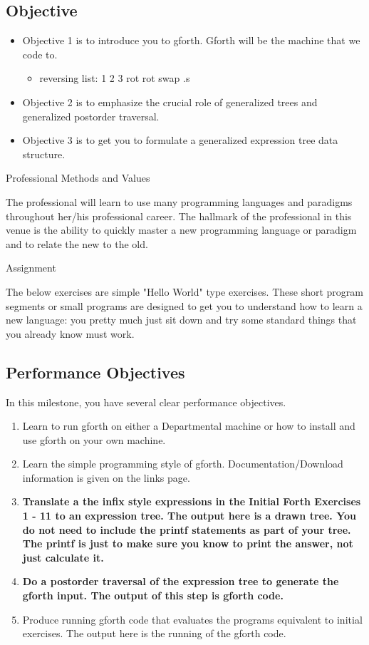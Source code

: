 \documentclass[letterpaper,10pt]{article}
\begin{document}
\subsection{Objective}
\begin{itemize}
\item Objective 1 is to introduce you to gforth. Gforth will be the machine that we code to.
\begin{itemize}
\item reversing list: 1 2 3 rot rot swap .s 
\end{itemize}
\item Objective 2 is to emphasize the crucial role of generalized trees and generalized postorder traversal.
\item  Objective 3 is to get you to formulate a generalized expression tree data structure.
\end{itemize}






Professional Methods and Values

The professional will learn to use many programming languages and paradigms throughout her/his professional career. The hallmark of the professional in this venue is the ability to quickly master a new programming language or paradigm and to relate the new to the old.

Assignment

The below exercises are simple "Hello World" type exercises. These short program segments or small programs are designed to get you to understand how to learn a new language: you pretty much just sit down and try some standard things that you already know must work.
\newpage
\subsection{Performance Objectives}

In this milestone, you have several clear performance objectives.
\begin{enumerate}

\item Learn to run gforth on either a Departmental machine or how to install and use gforth on your own machine.
\item Learn the simple programming style of gforth. Documentation/Download information is given on the links page.
\item \textbf{Translate a the infix style expressions in the Initial Forth Exercises 1 - 11 to an expression tree. The output here is a drawn tree. You do not need to include the printf statements as part of your tree. The printf is just to make sure you know to print the answer, not just calculate it.}
\item\textbf{ Do a postorder traversal of the expression tree to generate the gforth input. The output of this step is gforth code.}
\item Produce running gforth code that evaluates the programs equivalent to initial exercises. The output here is the running of the gforth code.
\end{enumerate}
\end{document}
